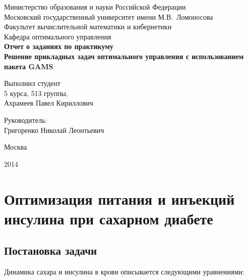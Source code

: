\documentclass[14pt]{article}
\begin{document}
\begin{titlepage}

\begin{centering}
Министерство образования и науки Российской Федерации\\
Московский государственный университет имени М.В.~Ломоносова\\
Факультет вычислительной математики и кибернетики\\
Кафедра оптимального управления\\

\vfill
\LARGE
\textbf{Отчет о заданиях по практикуму}\\
\textbf{Решение прикладных задач оптимального управления с использованием пакета GAMS}\\

\vfill

\end{centering}

\begin{flushright}

Выполнил студент\\
5 курса, 513 группы,\\
Ахрамеев Павел Кириллович\\

\vspace{0.7cm}

Руководитель:\\
Григоренко Николай Леонтьевич\\

\end{flushright}

\vfill

\centerline{Москва}
\centerline{2014}

\end{titlepage}

\pagebreak

\setcounter{page}{2}

\tableofcontents

\newpage

\section{Оптимизация питания и инъекций инсулина при сахарном диабете}
\subsection{Постановка задачи}

Динамика сахара и инсулина в крови описывается следующими уравнениями:
\end{document}
